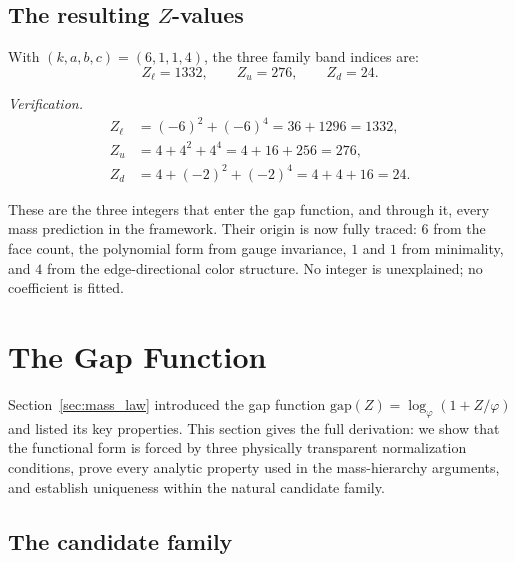 \documentclass[11pt,a4paper]{article}
\theoremstyle{definition}
\theoremstyle{remark}
\newcommand{\phig}{\varphi}
\newcommand{\Zidx}{Z}
\begin{document}
\subsection{The resulting $\Zidx$-values}

With $(k, a, b, c) = (6, 1, 1, 4)$, the three family band indices are:
\begin{equation}
  \boxed{\Zidx_\ell = 1332, \qquad \Zidx_u = 276, \qquad \Zidx_d = 24.}
  \label{eq:Z_values}
\end{equation}

\noindent\textit{Verification.}
\begin{align*}
  \Zidx_\ell &= (-6)^2 + (-6)^4 = 36 + 1296 = 1332, \\
  \Zidx_u    &= 4 + 4^2 + 4^4 = 4 + 16 + 256 = 276, \\
  \Zidx_d    &= 4 + (-2)^2 + (-2)^4 = 4 + 4 + 16 = 24.
\end{align*}

These are the three integers that enter the gap function, and through it,
every mass prediction in the framework.  Their origin is now fully
traced: $6$ from the face count, the polynomial form from gauge invariance,
$1$ and $1$ from minimality, and $4$ from the edge-directional color
structure.  No integer is unexplained; no coefficient is fitted.


\section{The Gap Function}
\label{sec:gap_function}

Section~\ref{sec:mass_law} introduced the gap function
$\mathrm{gap}(\Zidx) = \log_\phig(1 + \Zidx/\phig)$ and listed its
key properties.  This section gives the full derivation: we show that the
functional form is forced by three physically transparent normalization
conditions, prove every analytic property used in the mass-hierarchy arguments,
and establish uniqueness within the natural candidate family.

\subsection{The candidate family}
\end{document}
